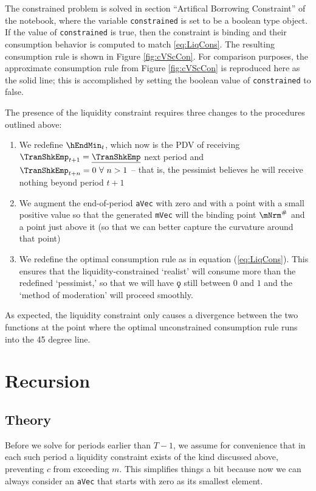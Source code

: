 \documentclass[titlepage, headings=optiontotocandhead]{\econtex}
\begin{document}
The constrained problem is solved in section ``Artifical Borrowing Constraint''
of the notebook, where the variable
\texttt{constrained} is set to be a boolean type object. If the value of \texttt{constrained}
is true, then the constraint is binding and their consumption behavior is computed to match
\eqref{eq:LiqCons}. The resulting consumption rule is shown in Figure \ref{fig:cVScCon}. For comparison purposes,
the approximate consumption rule from Figure \ref{fig:cVScCon} is
reproduced here as the solid line; this is accomplished by setting the boolean value
of \texttt{constrained} to false.

The presence of the liquidity
constraint requires three changes to the procedures outlined above:
\begin{enumerate}
\item We redefine
  $\hEndMin_{t}$, which now is the PDV of receiving
  $\TranShkEmp_{t+1}=\TranShkEmpMin$ next period and
  $\TranShkEmp_{t+n}=0~\forall~n>1$ -- that is, the pessimist believes he
  will receive nothing beyond period $t+1$
\item We augment the end-of-period \texttt{aVec} with zero and with a point with a small positive value so that the generated 
  \texttt{mVec} will the binding point $\mNrm^{\#}$ and a point just above it (so that we can better capture the curvature
  around that point)
\item We redefine the optimal consumption rule as
  in equation (\ref{eq:LiqCons}).  This ensures that the
  liquidity-constrained `realist' will consume more than the redefined
  `pessimist,' so that we will have $\koppa$ still between $0$ and $1$
  and the `method of moderation' will proceed smoothly. 
\end{enumerate}

As expected, the
liquidity constraint only causes a divergence between the two
functions at the point where the optimal unconstrained consumption
rule runs into the 45 degree line.

\hypertarget{Recursions}{}
\section{Recursion}\label{sec:recursion}
\hypertarget{Theory}{}
\subsection{Theory}
Before we solve for periods earlier than $T-1$, we assume for
convenience that in each such period a liquidity constraint exists of
the kind discussed above, preventing ${c}$ from exceeding ${m}$. This
simplifies things a bit because now we can always consider an
\texttt{aVec} that starts with zero as its smallest element.
\end{document}
